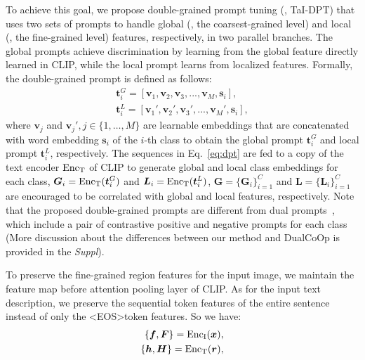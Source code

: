 \documentclass[10pt,twocolumn,letterpaper]{article}
\begin{document}
To achieve this goal, we propose double-grained prompt tuning (\ie, TaI-DPT) that uses two sets of prompts to handle global (\ie, the coarsest-grained level) and local (\ie, the fine-grained level) features, respectively, in two parallel branches. The global prompts achieve discrimination by learning from the global feature directly learned in CLIP, while the local prompt learns from localized features. 
Formally, the double-grained prompt is defined as follows:
\begin{equation}
\begin{split}
  \boldsymbol t^G_i = [\boldsymbol v_1, \boldsymbol v_2, \boldsymbol v_3, ..., \boldsymbol v_M, \boldsymbol s_i], \\
  \boldsymbol t^L_i = [\boldsymbol v_1', \boldsymbol v_2', \boldsymbol v_3', ..., \boldsymbol v_M', \boldsymbol s_i],
  \label{eq:dpt}
\end{split}
\end{equation}
\noindent where $\boldsymbol v_j$ and $\boldsymbol v_j', j \in\{1, \ldots, M\}$ are learnable embeddings that are concatenated with word embedding $ \boldsymbol s_i$ of the $i$-th class to obtain the global prompt $\boldsymbol t^G_i$ and local prompt $\boldsymbol t^L_i$, respectively.
The sequences in Eq.~\eqref{eq:dpt} are fed to a copy of the text encoder $\rm Enc_T$ of CLIP to generate global and local class embeddings for each class, \ie $\boldsymbol G_i = {\rm Enc_T}(\boldsymbol t^G_i)$ and $\boldsymbol L_i = {\rm Enc_T}(\boldsymbol t^L_i)$,
$\boldsymbol G =\{\boldsymbol G_i\}^C_{i=1}$ and $\boldsymbol L =\{\boldsymbol L_i\}^C_{i=1}$ are encouraged to be correlated with global and local features, respectively. Note that the proposed double-grained prompts are different from dual prompts~\cite{dualcoop}, which include a pair of contrastive positive and negative prompts for each class (More discussion about the differences between our method and DualCoOp is provided in the \emph{Suppl}).


To preserve the fine-grained region features for the input image, we maintain the feature map before attention pooling layer of CLIP.
As for the input text description, we preserve the sequential token features of the entire sentence instead of only the \textless EOS\textgreater token features. 
So we have:
\begin{equation}
\begin{split}
  \{\boldsymbol f, \boldsymbol F \} = {\rm Enc_I}(\boldsymbol x), \\
  \{\boldsymbol h, \boldsymbol H \} = {\rm Enc_T}(\boldsymbol r),
  \label{eq:enct}
\end{split}
\end{equation}
\end{document}
